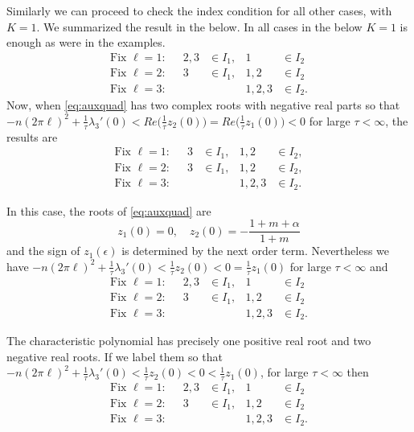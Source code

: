 \documentclass[a4paper,11pt]{article}
\def\l{(2\pi \ell)}
\theoremstyle{remark}
\begin{document}
 Similarly we can proceed to check the index condition for all other cases, with $K=1$.
We summarized the result in the below. In all cases in the below $K=1$ is enough as were in the examples.
\begin{align*}
  \text{Fix $\ell=1$:}&& 2,3&\in I_1, & 1&\in I_2\\
  \text{Fix $\ell=2$:}&& 3&\in I_1, & 1,2&\in I_2\\
  \text{Fix $\ell=3$:}&& & & 1,2,3&\in I_2.
\end{align*}
Now, when \eqref{eq:auxquad} has two complex roots with negative real parts so that $-n\l^2 + \frac{1}{\tau}\lambda_3'(0)<Re\Big(\frac{1}{\tau}z_2(0)\Big)=Re\Big(\frac{1}{\tau}z_1(0)\Big)<0$ for large $\tau<\infty$, the results are
\begin{align*}
  \text{Fix $\ell=1$:}&& 3&\in I_1, & 1,2&\in I_2,\\
  \text{Fix $\ell=2$:}&& 3&\in I_1, & 1,2&\in I_2,\\
  \text{Fix $\ell=3$:}&& & & 1,2,3&\in I_2.
\end{align*}


 In this case, the roots of \eqref{eq:auxquad} are
$$ z_1(0)=0, \quad z_2(0) = -\frac{1+m+\alpha}{1+m}$$
and the sign of $z_1(\epsilon)$ is determined by the next order term. Nevertheless we have
$-n\l^2 + \frac{1}{\tau}\lambda_3'(0)<\frac{1}{\tau}z_2(0)<0=\frac{1}{\tau}z_1(0)$ for large $\tau<\infty$ and
\begin{align*}
  \text{Fix $\ell=1$:}&& 2,3&\in I_1, & 1&\in I_2\\
  \text{Fix $\ell=2$:}&& 3&\in I_1, & 1,2&\in I_2\\
  \text{Fix $\ell=3$:}&& & & 1,2,3&\in I_2.
\end{align*}

The characteristic polynomial has precisely one positive real root and two negative real roots. If we label them so that
$-n\l^2 + \frac{1}{\tau}\lambda_3'(0)<\frac{1}{\tau}z_2(0)<0<\frac{1}{\tau}z_1(0)$, for large $\tau<\infty$ then
\begin{align*}
  \text{Fix $\ell=1$:}&& 2,3&\in I_1, & 1&\in I_2\\
  \text{Fix $\ell=2$:}&& 3&\in I_1, & 1,2&\in I_2\\
  \text{Fix $\ell=3$:}&& & & 1,2,3&\in I_2.
\end{align*}
\end{document}
